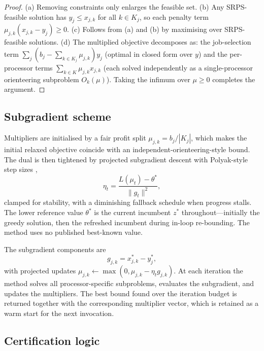 \documentclass[preprint,12pt]{elsarticle}
\begin{document}
\begin{proof}
(a) Removing constraints only enlarges the feasible set. (b) Any SRPS-feasible solution has $y_j\le x_{j,k}$ for all $k\in K_j$, so each penalty term $\mu_{j,k}(x_{j,k}-y_j)\ge 0$. (c) Follows from (a) and (b) by maximising over SRPS-feasible solutions. (d) The multiplied objective decomposes as: the job-selection term $\sum_j (b_j-\sum_{k\in K_j}\mu_{j,k})y_j$ (optimal in closed form over $y$) and the per-processor terms $\sum_{k\in K}\mu_{j,k}x_{j,k}$ (each solved independently as a single-processor orienteering subproblem $O_k(\mu)$). Taking the infimum over $\mu\ge 0$ completes the argument.
\end{proof}

\subsection{Subgradient scheme}\label{sec:subgradient}

Multipliers are initialised by a fair profit split $\mu_{j,k}=b_j/|K_j|$, which makes the initial relaxed objective coincide with an independent-orienteering-style bound. The dual is then tightened by projected subgradient descent with Polyak-style step sizes \cite{PolyakStepSize},
\[
\eta_t = \frac{L(\mu_t)-\theta^*}{\|g_t\|^2},
\]
clamped for stability, with a diminishing fallback schedule when progress stalls. The lower reference value $\theta^*$ is the current incumbent $z^*$ throughout---initially the greedy solution, then the refreshed incumbent during in-loop re-bounding. The method uses no published best-known value.

The subgradient components are
\[
g_{j,k}=x^*_{j,k}-y^*_j,
\]
with projected updates $\mu_{j,k}\leftarrow \max(0,\mu_{j,k}-\eta_t g_{j,k})$. At each iteration the method solves all processor-specific subproblems, evaluates the subgradient, and updates the multipliers. The best bound found over the iteration budget is returned together with the corresponding multiplier vector, which is retained as a warm start for the next invocation.

\subsection{Certification logic}\label{sec:certification}
\end{document}
